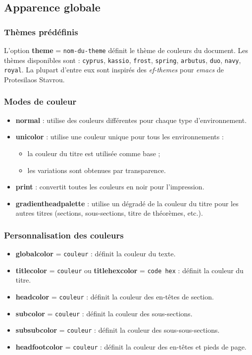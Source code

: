 \documentclass[
    french,
    margin=2cm
]{neoschool}
\begin{document}
\subsection{Apparence globale}

\subsubsection{Thèmes prédéfinis}

L'option \textbf{theme} = \texttt{nom-du-theme} définit
le thème de couleurs du document. Les thèmes disponibles sont : \texttt{cyprus}, \texttt{kassio}, \texttt{frost}, \texttt{spring}, \texttt{arbutus}, \texttt{duo}, \texttt{navy}, \texttt{royal}. La plupart d'entre eux sont inspirés des \textit{ef-themes} pour \textit{emacs} de Protesilaos Stavrou.

\subsubsection{Modes de couleur}

\begin{itemize}
\item \textbf{normal} : utilise des couleurs différentes pour chaque type
  d'environnement.
\item \textbf{unicolor} : utilise une couleur unique pour tous les
  environnements :
  \begin{itemize}
  \item la couleur du titre est utilisée comme base ;
  \item les variations sont obtenues par transparence.
  \end{itemize}
\item \textbf{print} : convertit toutes les couleurs en noir pour
  l'impression.
\item \textbf{gradientheadpalette} : utilise un dégradé de la couleur du titre pour les autres titres (sections, sous-sections, titre de théorèmes,  etc.).
\end{itemize}

\subsubsection{Personnalisation des couleurs}

\begin{itemize}
\item \textbf{globalcolor} = \texttt{couleur} : définit la
  couleur du texte.
\item \textbf{titlecolor} = \texttt{couleur} ou \textbf{titlehexcolor} = \texttt{code hex} : définit la
  couleur du titre.
\item \textbf{headcolor} = \texttt{couleur} : définit la
  couleur des en-têtes de section.
\item \textbf{subcolor} = \texttt{couleur} : définit la
  couleur des sous-sections.
\item \textbf{subsubcolor} = \texttt{couleur} : définit la
  couleur des sous-sous-sections.
\item \textbf{headfootcolor} = \texttt{couleur} : définit
  la couleur des en-têtes et pieds de page.
\end{itemize}
\end{document}
